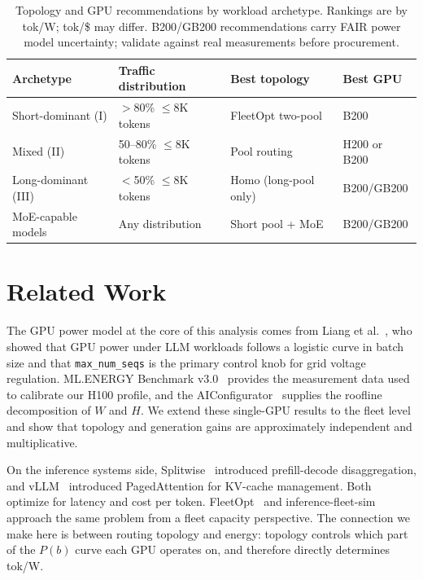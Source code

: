 \documentclass[11pt,a4paper]{article}
\begin{document}
\begin{table}[htbp]
\centering
\caption{Topology and GPU recommendations by workload archetype.  Rankings
  are by tok/W; tok/\$ may differ.  B200/GB200 recommendations carry FAIR
  power model uncertainty; validate against real measurements before
  procurement.}
\label{tab:guidance}
\small
\begin{tabular}{llll}
\toprule
Archetype & Traffic distribution & Best topology & Best GPU \\
\midrule
Short-dominant (I)   & $>$80\% $\leq$8K tokens  & FleetOpt two-pool    & B200 \\
Mixed (II)           & 50--80\% $\leq$8K tokens & Pool routing          & H200 or B200 \\
Long-dominant (III)  & $<$50\% $\leq$8K tokens  & Homo (long-pool only) & B200/GB200 \\
MoE-capable models   & Any distribution          & Short pool + MoE      & B200/GB200 \\
\bottomrule
\end{tabular}
\end{table}

\section{Related Work}
\label{sec:related}

The GPU power model at the core of this analysis comes from Liang et
al.~\citep{liang2026g2g}, who showed that GPU power under LLM workloads
follows a logistic curve in batch size and that \texttt{max\_num\_seqs} is
the primary control knob for grid voltage regulation.  ML.ENERGY Benchmark v3.0~\citep{chung2026mlenergy} provides
the measurement data used to calibrate our H100 profile, and the
AIConfigurator~\citep{xu2026aiconfigurator} supplies the roofline
decomposition of $W$ and $H$.  We extend these single-GPU results to the
fleet level and show that topology and generation gains are approximately
independent and multiplicative.

On the inference systems side, Splitwise~\citep{patel2023splitwise} introduced
prefill-decode disaggregation, and vLLM~\citep{kwon2023vllm} introduced
PagedAttention for KV-cache management.  Both optimize for latency and cost
per token.  FleetOpt~\citep{chen2026fleetopt} and
inference-fleet-sim~\citep{chen2026fleetsim} approach the same problem from a
fleet capacity perspective.  The connection we make here is between routing
topology and energy: topology controls which part of the $P(b)$ curve each
GPU operates on, and therefore directly determines tok/W.
\end{document}
